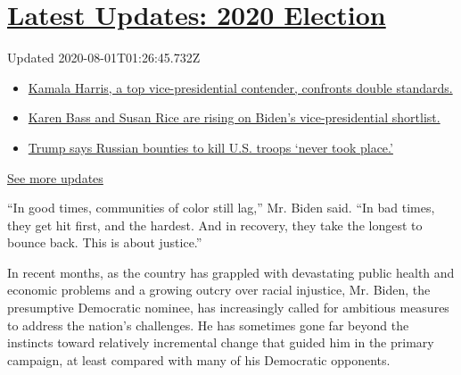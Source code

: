 \hypertarget{latest-updates-2020-election}{%
\section{\texorpdfstring{\href{https://www.nytimes.com/2020/07/31/us/elections/biden-vs-trump.html?action=click\&pgtype=Article\&state=default\&region=MAIN_CONTENT_1\&context=storylines_live_updates}{Latest
Updates: 2020
Election}}{Latest Updates: 2020 Election}}\label{latest-updates-2020-election}}

Updated 2020-08-01T01:26:45.732Z

\begin{itemize}
\tightlist
\item
  \href{https://www.nytimes.com/2020/07/31/us/elections/biden-vs-trump.html?action=click\&pgtype=Article\&state=default\&region=MAIN_CONTENT_1\&context=storylines_live_updates\#link-29fdff45}{Kamala
  Harris, a top vice-presidential contender, confronts double
  standards.}
\item
  \href{https://www.nytimes.com/2020/07/31/us/elections/biden-vs-trump.html?action=click\&pgtype=Article\&state=default\&region=MAIN_CONTENT_1\&context=storylines_live_updates\#link-13ec3d9c}{Karen
  Bass and Susan Rice are rising on Biden's vice-presidential
  shortlist.}
\item
  \href{https://www.nytimes.com/2020/07/31/us/elections/biden-vs-trump.html?action=click\&pgtype=Article\&state=default\&region=MAIN_CONTENT_1\&context=storylines_live_updates\#link-49e9a016}{Trump
  says Russian bounties to kill U.S. troops `never took place.'}
\end{itemize}

\href{https://www.nytimes.com/2020/07/31/us/elections/biden-vs-trump.html?action=click\&pgtype=Article\&state=default\&region=MAIN_CONTENT_1\&context=storylines_live_updates}{See
more updates}

``In good times, communities of color still lag,'' Mr. Biden said. ``In
bad times, they get hit first, and the hardest. And in recovery, they
take the longest to bounce back. This is about justice.''

In recent months, as the country has grappled with devastating public
health and economic problems and a growing outcry over racial injustice,
Mr. Biden, the presumptive Democratic nominee, has increasingly called
for ambitious measures to address the nation's challenges. He has
sometimes gone far beyond the instincts toward relatively incremental
change that guided him in the primary campaign, at least compared with
many of his Democratic opponents.

